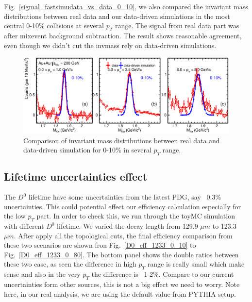 Fig.~\ref{sigmal_fastsimudata_vs_data_0_10}, we also compared the invariant mass distributions between real data and our data-driven simulations in the most central 0-10\% collisions at several $p_T$ range. The signal from real data part was after mixevent background subtraction. The result shows reasonable agreement, even though we didn't cut the invmass rely on data-driven simulations.

\begin{figure}[htbp]
\centering
\includegraphics[keepaspectratio,width=1.0\textwidth,angle=0]{figure/Run14_D0HFT/sigmal_fastsimudata_vs_data_0_10}
\caption{Comparison of invariant mass distributions between real data and data-driven simulation for 0-10\% in several $p_{T}$ range.}
\label{fig:sigmal_fastsimudata_vs_data_0_10}
\end{figure}


\subsection{Lifetime uncertainties effect} 

The $D^0$ lifetime have some uncertainties from the latest PDG, say ~0.3\% uncertainties. This could potential effect our efficiency calculation especially for the low $p_T$ part. In order to check this, we run through the toyMC simulation with different $D^0$ lifetime. We varied the decay length from 129.9 $\mu m$ to 123.3 $\mu m$. After apply all the topological cuts, the final efficiency comparison from these two scenarios are shown fron Fig.~\ref{D0_eff_1233_0_10} to Fig.~\ref{D0_eff_1233_0_80}. The bottom panel shows the double ratios between these two case, as seen the difference in high $p_T$ range is really small which make sense and also in the very $p_T$ the difference is ~1-2\%. Compare to our current uncertainties form other sources, this is not a big effect we need to worry. Note here, in our real analysis, we are using the default value from PYTHIA setup.

